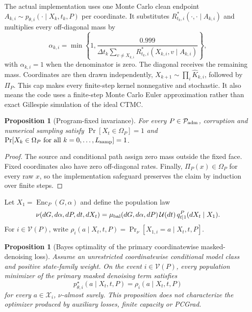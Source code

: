 \documentclass{article}
\newtheorem{proposition}[theorem]{Proposition}
\begin{document}
The actual implementation uses one Monte Carlo clean endpoint
$A_{k,i}\sim p_{\theta,i}(\cdot\mid X_k,t_k,P)$ per coordinate. It substitutes
$R^*_{t_k,i}(\cdot,\cdot\mid A_{k,i})$ and multiplies every off-diagonal mass by
\begin{equation}
 \alpha_{k,i}=\min\!\left\{1,
 \frac{0.999}{\Delta t_k\sum_{v\neq X_{k,i}}
 R^*_{t_k,i}(X_{k,i},v\mid A_{k,i})}\right\},
\end{equation}
with $\alpha_{k,i}=1$ when the denominator is zero. The diagonal receives the remaining mass.
Coordinates are then drawn independently, $X_{k+1}\sim\prod_i\widehat K_{k,i}$, followed by
$\Pi_P$. This cap makes every finite-step kernel nonnegative and stochastic. It also means the code
uses a finite-step Monte Carlo Euler approximation rather than exact Gillespie simulation of the
ideal CTMC.

\begin{proposition}[Program-fixed invariance]
\label{prop:fixed-invariance}
For every $P\in\mathcal P_{\rm adm}$, corruption and numerical sampling satisfy
$\Pr[X_t\in\Omega_P]=1$ and
$\Pr[X_k\in\Omega_P\text{ for all }k=0,\ldots,L_{\rm samp}]=1$.
\end{proposition}

\begin{proof}
The source and conditional path assign zero mass outside the fixed face. Fixed coordinates also have
zero off-diagonal rates. Finally, $\Pi_P(x)\in\Omega_P$ for every raw $x$, so the implementation
safeguard preserves the claim by induction over finite steps.
\end{proof}

Let $X_1=\operatorname{Enc}_P(G,\alpha)$ and define the population law
\begin{equation}
 \nu(dG,d\alpha,dP,dt,dX_t)=
 \mu_{\rm bal}(dG,d\alpha,dP)\,\mathcal U(dt)\,
 q_{t\mid1}^P(dX_t\mid X_1).
\end{equation}
For $i\in\mathcal V(P)$, write
$\rho_i(a\mid X_t,t,P)=\Pr_\nu[X_{1,i}=a\mid X_t,t,P]$.

\begin{proposition}[Bayes optimality of the primary coordinatewise masked-denoising loss]
\label{prop:masked-bayes}
Assume an unrestricted coordinatewise conditional model class and positive state-family weight.
On the event $i\in\mathcal V(P)$, every population minimizer of the primary masked denoising term
satisfies
\begin{equation}
 p_{\theta,i}^\star(a\mid X_t,t,P)=\rho_i(a\mid X_t,t,P)
\end{equation}
for every $a\in\mathcal X_i$, $\nu$-almost surely. This proposition does not characterize the
optimizer produced by auxiliary losses, finite capacity or PCGrad.
\end{proposition}
\end{document}
